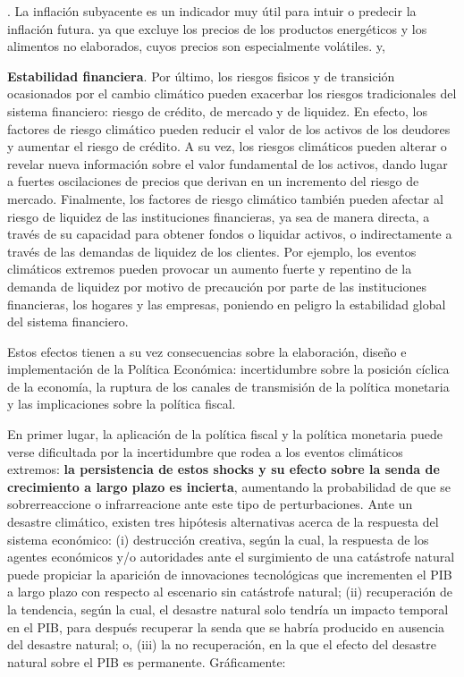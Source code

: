 \documentclass[10pt,a4paper]{article}
\newcounter{numitem}
\newenvironment{lnum}
      {\begin{list}{\arabic{numitem}.}{%
          \usecounter{numitem}%
          \setlength{\leftmargin}{1cm}%
          \setlength{\parskip}{3pt}%
          \setlength{\itemsep}{0pt}%
          \setlength{\parsep}{0pt}%
      }}
      {\end{list}}
\begin{document}
\begin{lnum}
{        La inflación subyacente es un indicador muy útil para intuir o predecir la inflación futura. ya que excluye los precios de los productos energéticos y los alimentos no elaborados, cuyos precios son especialmente volátiles.
    } y,
    \item \textbf{Estabilidad financiera}. Por último, los riesgos fisicos y de transición ocasionados por el cambio climático pueden exacerbar los riesgos tradicionales del sistema financiero: riesgo de crédito, de mercado y de liquidez. En efecto, los factores de riesgo climático pueden reducir el valor de los activos de los deudores y aumentar el riesgo de crédito. A su vez, los riesgos climáticos pueden alterar o revelar nueva información sobre el valor fundamental de los activos, dando lugar a fuertes oscilaciones de precios que derivan en un incremento del riesgo de mercado. Finalmente, los factores de riesgo climático también pueden afectar al riesgo de liquidez de las instituciones financieras, ya sea de manera directa, a través de su capacidad para obtener fondos o liquidar activos, o indirectamente a través de las demandas de liquidez de los clientes. Por ejemplo, los eventos climáticos extremos pueden provocar un aumento fuerte y repentino de la demanda de liquidez por motivo de precaución por parte de las instituciones financieras, los hogares y las empresas, poniendo en peligro la estabilidad global del sistema financiero. 
\end{lnum}

Estos efectos tienen a su vez consecuencias sobre la elaboración, diseño e implementación de la Política Económica: incertidumbre sobre la posición cíclica de la economía, la ruptura de los canales de transmisión de la política monetaria y las implicaciones sobre la política fiscal. 

En primer lugar, la aplicación de la política fiscal y la política monetaria puede verse dificultada por la incertidumbre que rodea a los eventos climáticos extremos: \textbf{la persistencia de estos shocks y su efecto sobre la senda de crecimiento a largo plazo es incierta}, aumentando la probabilidad de que se sobrerreaccione o infrarreacione ante este tipo de perturbaciones. Ante un desastre climático, existen tres hipótesis alternativas acerca de la respuesta del sistema económico: (i) destrucción creativa, según la cual, la respuesta de los agentes económicos y/o autoridades ante el surgimiento de una catástrofe natural puede propiciar la aparición de innovaciones tecnológicas que incrementen el PIB a largo plazo con respecto al escenario sin catástrofe natural; (ii) recuperación de la tendencia, según la cual, el desastre natural solo tendría un impacto temporal en el PIB, para después recuperar la senda que se habría producido en ausencia del desastre natural; o, (iii) la no recuperación, en la que el efecto del desastre natural sobre el PIB es permanente. Gráficamente:
\end{document}
